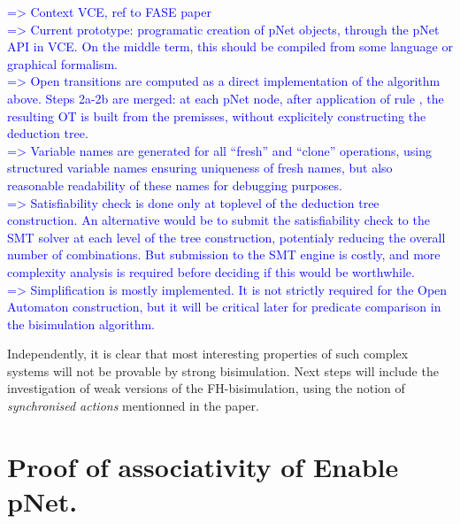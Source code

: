 \documentclass{lncs/llncs}
\newcommand{\ERIC}[1]{\textcolor{blue}{#1}}
\begin{document}
\ERIC{
=> Context VCE, ref to FASE paper\\
=> Current prototype: programatic creation of pNet objects, through the pNet API in VCE. On the middle term, this should be compiled from some language or graphical formalism.\\
=> Open transitions are computed as a direct implementation of the algorithm above. Steps 2a-2b are merged: at each pNet node, after application of rule \TrDeux, the resulting OT is built from the premisses, without explicitely constructing the deduction tree. \\
=> Variable names are generated for all ``fresh'' and ``clone'' operations, using structured variable names ensuring uniqueness of fresh names, but also reasonable readability of these names for debugging purposes.\\
=> Satisfiability check is done only at toplevel of the deduction tree construction. An alternative would be to submit the satisfiability check to the SMT solver at each level of the tree construction, potentialy reducing the overall number of combinations. But submission to the SMT engine is costly, and more complexity analysis is required before deciding if this would be worthwhile.\\
=> Simplification is mostly implemented. It is not strictly required for the Open Automaton construction, but it will be critical later for predicate comparison in the bisimulation algorithm.}


Independently, it is clear that most interesting properties of
such complex systems will not be provable by strong bisimulation.
Next steps will include the investigation of weak
versions of the FH-bisimulation, using the notion of
\emph{synchronised actions} mentionned in the paper.



% 


\newpage
\appendix

\section{Proof of associativity of Enable pNet.}
\label{appendix:assoc}
\end{document}
